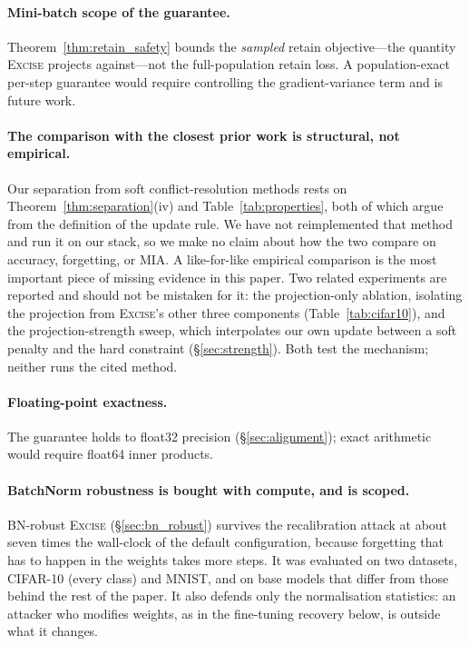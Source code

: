 \documentclass{article}
\newcommand{\ours}{\textsc{Excise}}
\newcommand{\added}[1]{{\color{revised}#1}}
\theoremstyle{remark}
\theoremstyle{plain}
\begin{document}
\paragraph{Mini-batch scope of the guarantee.} Theorem~\ref{thm:retain_safety}
bounds the \emph{sampled} retain objective---the quantity \ours{} projects
against---not the full-population retain loss. A population-exact per-step
guarantee would require controlling the gradient-variance term and is future
work.

\paragraph{The comparison with the closest prior work is structural, not
empirical.} Our separation from soft conflict-resolution methods
\citep{patel2025learning} rests on Theorem~\ref{thm:separation}(iv) and
Table~\ref{tab:properties}, both of which argue from the definition of the
update rule. We have not reimplemented that method and run it on our stack, so
we make no claim about how the two compare on accuracy, forgetting, or MIA. A
like-for-like empirical comparison is the most important piece of missing
evidence in this paper. Two related experiments are reported and should not be
mistaken for it: the projection-only ablation, isolating the projection from
\ours{}'s other three components (Table~\ref{tab:cifar10}), and the
projection-strength sweep, which interpolates our own update between a soft
penalty and the hard constraint (\S\ref{sec:strength}). Both test the mechanism;
neither runs the cited method.

\paragraph{Floating-point exactness.} The guarantee holds to float32 precision
(\S\ref{sec:alignment}); exact arithmetic would require float64 inner products.

\added{\paragraph{BatchNorm robustness is bought with compute, and is scoped.}
BN-robust \ours{} (\S\ref{sec:bn_robust}) survives the recalibration attack at
about seven times the wall-clock of the default configuration, because forgetting
that has to happen in the weights takes more steps. It was evaluated on two
datasets, CIFAR-10 (every class) and MNIST, and on base models that differ from
those behind the rest of the paper. It also defends only the normalisation
statistics: an attacker who modifies weights, as in the fine-tuning recovery
below, is outside what it changes.}
\end{document}
